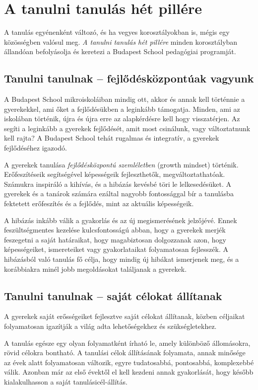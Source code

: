 \section{A tanulni tanulás hét pillére}
A tanulás egyénenként változó, és ha vegyes korosztályokban is, mégis egy közösségben valósul meg. \emph{A tanulni tanulás hét pillére} minden korosztályban állandóan befolyásolja és keretezi a Budapest School pedagógiai programját.

\subsection{Tanulni tanulnak -- fejlődésközpontúak vagyunk}
A Budapest School mikroiskoláiban mindig ott, akkor és annak kell történnie a gyerekekkel, ami őket a fejlődésükben a leginkább támogatja. Minden, ami az iskolában történik, újra és újra erre az alapkérdésre kell hogy visszatérjen. Az segíti a leginkább a gyerekek fejlődését, amit most csinálunk, vagy változtatnunk kell rajta? A Budapest School tehát rugalmas és integratív, a gyerekek fejlődéséhez igazodó.

A gyerekek tanulása \emph{fejlődésközpontú szemléletben} \citep{growthmindset} (growth mindset) történik.  Erőfeszítéseik segítségével képességeik fejleszthetők, megváltoztathatóak. Számukra inspiráló a kihívás, és a hibázás kevésbé töri le lelkesedésüket. A gyerekek és a tanárok számára ezáltal nagyobb fontossággal bír a tanulásba fektetett erőfeszítés és a fejlődés, mint az aktuális képességeik.

A hibázás inkább válik a gyakorlás és az új megismerésének jelzőjévé. Ennek feszültségmentes kezelése kulcsfontosságú abban, hogy a gyerekek merjék feszegetni a saját határaikat, hogy magabiztosan dolgozzanak azon, hogy képességeiket, ismereteiket vagy gyakorlataikat folyamatosan fejlesszék. A hibázásból való tanulás fő célja, hogy mindig új hibákat ismerjenek meg, és a korábbiakra minél jobb megoldásokat találjanak a gyerekek.

\subsection{Tanulni tanulnak -- saját célokat állítanak}
A gyerekek saját erősségeiket fejlesztve saját célokat állítanak, közben céljaikat folyamatosan igazítják a világ adta lehetőségekhez és szükségletekhez.

A tanulás egésze egy olyan folyamatként írható le, amely különböző állomásokra, rövid célokra bontható. A tanulási célok állításának folyamata, annak minősége az évek alatt folyamatosan változik, egyre tudatosabbá, pontosabbá, komplexebbé válik. Azonban már az első évektől el kell kezdeni annak gyakorlását, hogy később kialakulhasson a saját tanulásicél-állítás.

